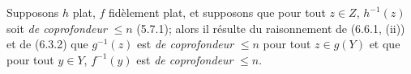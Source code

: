 \begin{remark}[6.6.2]
\label{IV.2.s6.6.2-fr}
Supposons $h$ plat, $f$ fidèlement plat, et supposons que pour tout
$z\in Z$, $h^{-1}(z)$ soit \emph{de coprofondeur} $\leqslant n$ (5.7.1); alors
il résulte du raisonnement de (6.6.1, (ii)) et de (6.3.2) que
$g^{-1}(z)$ est \emph{de coprofondeur} $\leqslant n$ pour tout $z\in g(Y)$ et
que pour tout $y\in Y$, $f^{-1}(y)$ est \emph{de coprofondeur} $\leqslant n$.
\end{remark}

